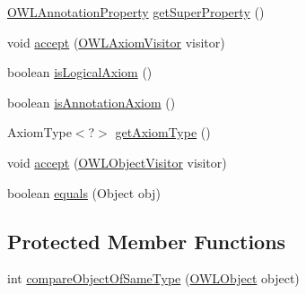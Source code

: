 \begin{DoxyCompactItemize}
\item 
\hyperlink{interfaceorg_1_1semanticweb_1_1owlapi_1_1model_1_1_o_w_l_annotation_property}{O\-W\-L\-Annotation\-Property} \hyperlink{classuk_1_1ac_1_1manchester_1_1cs_1_1owl_1_1owlapi_1_1_o_w_l_sub_annotation_property_of_axiom_impl_a351b8aab4f2d52c55732eba91ca5b1ba}{get\-Super\-Property} ()
\item 
void \hyperlink{classuk_1_1ac_1_1manchester_1_1cs_1_1owl_1_1owlapi_1_1_o_w_l_sub_annotation_property_of_axiom_impl_afac4916e0aefdd18696735b684bc464e}{accept} (\hyperlink{interfaceorg_1_1semanticweb_1_1owlapi_1_1model_1_1_o_w_l_axiom_visitor}{O\-W\-L\-Axiom\-Visitor} visitor)
\item 
boolean \hyperlink{classuk_1_1ac_1_1manchester_1_1cs_1_1owl_1_1owlapi_1_1_o_w_l_sub_annotation_property_of_axiom_impl_a917543524d478e15a110508052376c2d}{is\-Logical\-Axiom} ()
\item 
boolean \hyperlink{classuk_1_1ac_1_1manchester_1_1cs_1_1owl_1_1owlapi_1_1_o_w_l_sub_annotation_property_of_axiom_impl_ae7ed3b80e997969f20b7c1bccf2f2f81}{is\-Annotation\-Axiom} ()
\item 
Axiom\-Type$<$?$>$ \hyperlink{classuk_1_1ac_1_1manchester_1_1cs_1_1owl_1_1owlapi_1_1_o_w_l_sub_annotation_property_of_axiom_impl_ac4eb3752320ea5afda1d94367419f144}{get\-Axiom\-Type} ()
\item 
void \hyperlink{classuk_1_1ac_1_1manchester_1_1cs_1_1owl_1_1owlapi_1_1_o_w_l_sub_annotation_property_of_axiom_impl_ad82612f9b0386fb2b7a30158a2108703}{accept} (\hyperlink{interfaceorg_1_1semanticweb_1_1owlapi_1_1model_1_1_o_w_l_object_visitor}{O\-W\-L\-Object\-Visitor} visitor)
\item 
boolean \hyperlink{classuk_1_1ac_1_1manchester_1_1cs_1_1owl_1_1owlapi_1_1_o_w_l_sub_annotation_property_of_axiom_impl_ace6a685db342c5bba7612572a9f1688b}{equals} (Object obj)
\end{DoxyCompactItemize}
\subsection*{Protected Member Functions}
\begin{DoxyCompactItemize}
\item 
int \hyperlink{classuk_1_1ac_1_1manchester_1_1cs_1_1owl_1_1owlapi_1_1_o_w_l_sub_annotation_property_of_axiom_impl_a2f55666906743a4ff3413b769cf30cb1}{compare\-Object\-Of\-Same\-Type} (\hyperlink{interfaceorg_1_1semanticweb_1_1owlapi_1_1model_1_1_o_w_l_object}{O\-W\-L\-Object} object)
\end{DoxyCompactItemize}

